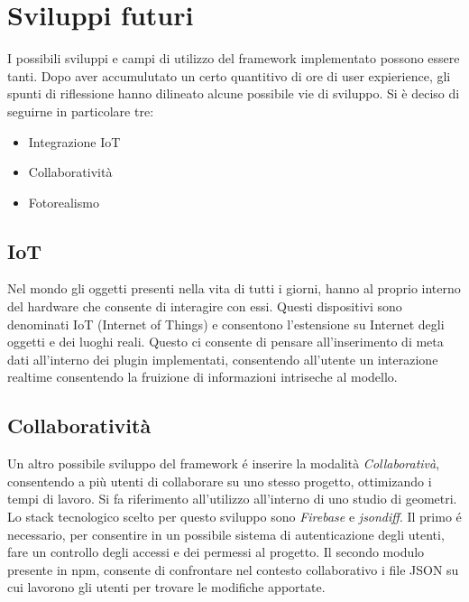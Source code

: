 \section{Sviluppi futuri}
\label{sec:conclusions_section_2}

I possibili sviluppi e campi di utilizzo del framework implementato possono essere tanti. Dopo aver accumulutato
un certo quantitivo di ore di user expierience, gli spunti di riflessione hanno dilineato alcune possibile vie di sviluppo.
Si \`e deciso di seguirne in particolare tre:
\begin{itemize}
\item Integrazione IoT
\item Collaboratività
\item Fotorealismo
\end{itemize}
\newpage

\subsection{IoT}
\label{sec:conclusions_section_2_sub_1}
Nel mondo gli oggetti presenti nella vita di tutti i giorni, hanno al proprio interno del hardware che consente di interagire
con essi. Questi dispositivi sono denominati IoT (Internet of Things) e consentono l'estensione su Internet degli oggetti e dei
luoghi reali. Questo ci consente di pensare all'inserimento di meta dati all'interno dei plugin implementati,
consentendo all'utente un interazione realtime consentendo la fruizione di informazioni intriseche al modello.

\newpage

\subsection{Collaboratività}
\label{sec:conclusions_section_2_sub_2}
Un altro possibile sviluppo del framework \'e inserire la modalità \emph{Collaborativà}, consentendo a più utenti
di collaborare su uno stesso progetto, ottimizando i tempi di lavoro. Si fa riferimento
all'utilizzo all'interno di uno studio di geometri. Lo stack tecnologico scelto per questo sviluppo sono
\emph{Firebase} e \emph{jsondiff}. Il primo \'e necessario, per consentire in un possibile sistema di autenticazione degli utenti,
fare un controllo degli accessi e dei permessi al progetto.
Il secondo modulo presente in npm, consente di confrontare nel contesto collaborativo i file JSON su cui lavorono
gli utenti per trovare le modifiche apportate.

